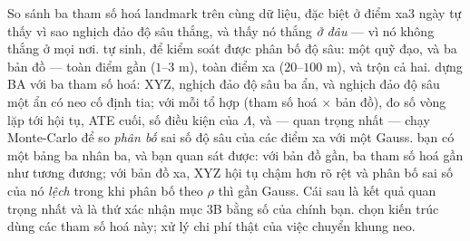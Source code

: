 \documentclass[../../vslam.tex]{subfiles}
\begin{document}
\begin{ungdung}
\end{ungdung}

\begin{duan}{So sánh ba tham số hoá landmark trên cùng dữ liệu, đặc biệt ở điểm xa}{3 ngày}
\dmt tự thấy vì sao nghịch đảo độ sâu thắng, và thấy nó thắng \emph{ở đâu} --- vì nó không thắng ở mọi nơi.
\ddl tự sinh, để kiểm soát được phân bố độ sâu: một quỹ đạo, và ba bản đồ --- toàn điểm gần (\(1\)--\(3\) m), toàn điểm xa (\(20\)--\(100\) m), và trộn cả hai.
\dbc dựng BA với ba tham số hoá: XYZ, nghịch đảo độ sâu ba ẩn, và nghịch đảo độ sâu một ẩn có neo cố định tia; với mỗi tổ hợp (tham số hoá \(\times\) bản đồ), đo số vòng lặp tới hội tụ, ATE cuối, số điều kiện của \(\Lambda\), và --- quan trọng nhất --- chạy Monte-Carlo để so \emph{phân bố} sai số độ sâu của các điểm xa với một Gauss.
\dxk bạn có một bảng ba nhân ba, và bạn quan sát được: với bản đồ gần, ba tham số hoá gần như tương đương; với bản đồ xa, XYZ hội tụ chậm hơn rõ rệt và phân bố sai số của nó \emph{lệch} trong khi phân bố theo \(\rho\) thì gần Gauss. Cái sau là kết quả quan trọng nhất và là thứ xác nhận  mục 3B bằng số của chính bạn.
\dnv {} chọn kiến trúc dùng các tham số hoá này;  xử lý chi phí thật của việc chuyển khung neo.
\end{duan}
\end{document}
